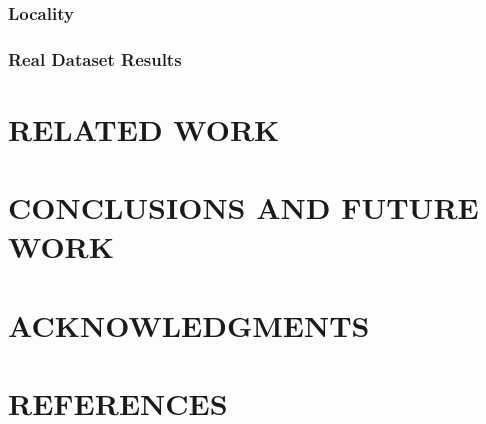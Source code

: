 \documentclass[lang=cn]{elegantpaper}
\begin{document}
\subsubsection{Locality}

\subsubsection{Real Dataset Results}

\newpage

\section{RELATED WORK}

\newpage

\section{CONCLUSIONS AND FUTURE WORK}

\newpage

\section{ACKNOWLEDGMENTS}

\newpage

\section{REFERENCES}
\end{document}
